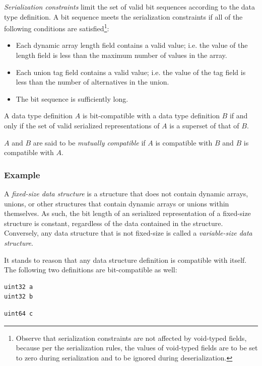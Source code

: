 \emph{Serialization constraints} limit the set of valid bit sequences according to the data type definition.
A bit sequence meets the serialization constraints if all of the following conditions are
satisfied\footnote{Observe that serialization constraints are not affected by void-typed fields,
because per the serialization rules, the values of void-typed fields are to be set to zero during serialization
and to be ignored during deserialization.}:
\begin{itemize}
    \item Each dynamic array length field contains a valid value;
    i.e. the value of the length field is less than the maximum number of values in the array.

    \item Each union tag field contains a valid value;
    i.e. the value of the tag field is less than the number of alternatives in the union.

    \item The bit sequence is sufficiently long.
\end{itemize}

A data type definition $A$ is bit-compatible with a data type definition $B$ if and only if
the set of valid serialized representations of $A$ is a superset of that of $B$.

$A$ and $B$ are said to be \emph{mutually compatible} if
$A$ is compatible with $B$ and $B$ is compatible with $A$.

\subsubsection{Example}

A \emph{fixed-size data structure} is a structure that does not contain dynamic arrays,
unions, or other structures that contain dynamic arrays or unions within themselves.
As such, the bit length of an serialized representation of a fixed-size structure is constant,
regardless of the data contained in the structure.
Conversely, any data structure that is not fixed-size is called a \emph{variable-size data structure}.

It stands to reason that any data structure definition is compatible with itself.
The following two definitions are bit-compatible as well:

\begin{verbatim}
uint32 a
uint32 b
\end{verbatim}

\begin{verbatim}
uint64 c
\end{verbatim}


